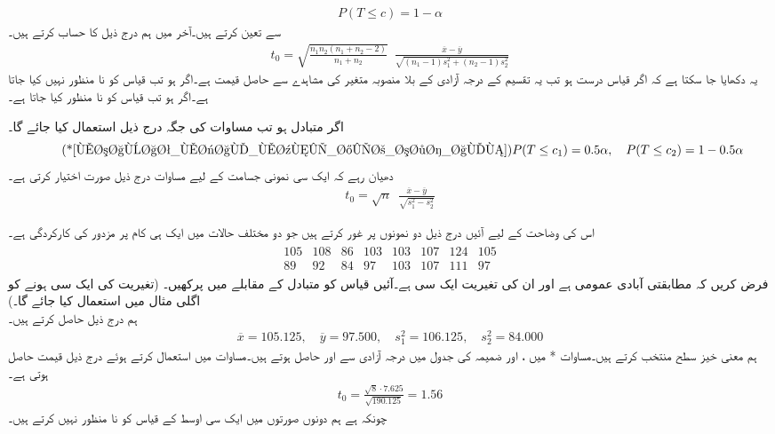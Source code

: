 \begin{align}\label{مساوات_مثال_معنی_خیز_سطح_الف}
P(T\le c)=1-\alpha
\end{align}
سے تعین کرتے ہیں۔آخر میں ہم درج ذیل کا حساب کرتے ہیں۔
\begin{align}\label{مساوات_مثال_معنی_خیز_سطح_ب}
t_0=\sqrt{\frac{n_1n_2(n_1+n_2-2)}{n_1+n_2}}\,\,\, \frac{\overline{x}-\overline{y}}{\sqrt{(n_1-1)s_1^2+(n_2-1)s_2^2}}
\end{align}
یہ دکھایا جا سکتا ہے کہ اگر قیاس درست ہو تب یہ   تقسیم کے   درجہ آزادی کے  بلا منصوبہ متغیر کی مشاہدے سے حاصل قیمت ہے۔اگر  ہو تب قیاس کو نا منظور نہیں کیا جاتا ہے۔اگر ہو تب قیاس کو نا منظور کیا جاتا ہے۔

اگر متبادل  ہو تب مساوات  کی جگہ درج ذیل استعمال کیا جائے گا۔
\begin{align*}\tag*{(*\ref{مساوات_مثال_معنی_خیز_سطح_الف})}
P(T\le c_1)=0.5\alpha,\quad P(T\le c_2)=1-0.5\alpha
\end{align*}
دھیان رہے کہ ایک سی  نمونی جسامت  کے لیے  مساوات  درج ذیل صورت اختیار کرتی ہے۔
\begin{align}\label{مساوات_مثال_معنی_خیز_سطح_پ}
t_0=\sqrt{n}\,\,\,\frac{\overline{x}-\overline{y}}{\sqrt{s_1^2-s_2^2}}
\end{align}

اس کی وضاحت کے لیے آئیں درج ذیل دو نمونوں پر غور کرتے ہیں جو دو مختلف حالات  میں ایک ہی کام پر مزدور کی کارکردگی ہے۔
\begin{align*}
\begin{array}{rrrrrrrr}
105&108&86&103&103&107&124&105\\
89&92&84&97&103&107&111&97
\end{array}
\end{align*}
فرض کریں کہ مطابقتی آبادی عمومی ہے اور ان کی تغیریت ایک سی ہے۔آئیں قیاس  کو متبادل  کے مقابلے میں پرکھیں۔ (تغیریت کی ایک سی  ہونے کو اگلی مثال میں استعمال کیا جائے گا۔)\\
\quad
ہم درج ذیل حاصل کرتے ہیں۔
\begin{align*}
\overline{x}=105.125,\quad \overline{y}=97.500,\quad s_1^2=106.125,\quad s_2^2=84.000
\end{align*}
ہم معنی خیز سطح  منتخب کرتے ہیں۔مساوات * میں ،  اور  ضمیمہ  کی جدول  میں  درجہ آزادی سے  اور  حاصل ہوتے ہیں۔مساوات  میں  استعمال کرتے ہوئے درج ذیل قیمت حاصل ہوتی ہے۔
\begin{align*}
t_0=\frac{\sqrt{8}\cdot 7.625}{\sqrt{190.125}}=1.56
\end{align*}
چونکہ  ہے ہم دونوں صورتوں میں ایک سی  اوسط کے  قیاس  کو نا منظور نہیں کرتے ہیں۔


